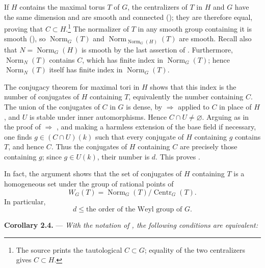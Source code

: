 If \(H\) contains the maximal torus \(T\) of \(G\), the centralizers
of \(T\) in \(H\) and \(G\) have the same dimension and are smooth
and connected (); they are therefore equal, proving that
\(C\subset H\).\footnote{The source prints the tautological
\(C\subset G\); equality of the two centralizers gives
\(C\subset H\).} The normalizer of \(T\) in any smooth group
containing it is smooth (), so
\(\operatorname{Norm}_G(T)\) and
\(\operatorname{Norm}_{\operatorname{Norm}_G(H)}(T)\) are smooth.
Recall also that \(N=\operatorname{Norm}_G(H)\) is smooth by the
last assertion of . Furthermore,
\(\operatorname{Norm}_N(T)\) contains \(C\), which has finite index
in \(\operatorname{Norm}_G(T)\); hence
\(\operatorname{Norm}_N(T)\) itself has finite index in
\(\operatorname{Norm}_G(T)\).

The conjugacy theorem for maximal tori in \(H\) shows that this index
is the number of conjugates of \(H\) containing \(T\), equivalently
the number containing \(C\). The union of the conjugates of \(C\) in
\(G\) is dense, by  \(\Rightarrow\)  applied to \(C\) in
place of \(H\), and \(U\) is stable under inner automorphisms. Hence
\(C\cap U\neq\varnothing\). Arguing as in the proof of
 \(\Rightarrow\) , and making a harmless extension of the
base field if necessary, one finds
\(g\in(C\cap U)(k)\) such that every conjugate of \(H\) containing
\(g\) contains \(T\), and hence \(C\). Thus the conjugates of \(H\)
containing \(C\) are precisely those containing \(g\); since
\(g\in U(k)\), their number is \(d\). This proves .

In fact, the argument shows that the set of conjugates of \(H\)
containing \(T\) is a homogeneous set under the group of rational
points of
\[
  W_G(T)=
  \operatorname{Norm}_G(T)/\operatorname{Centr}_G(T).
\]
In particular,
\[
  d\leq\text{the order of the Weyl group of \(G\)}.
\]

\medskip
\noindent{}\textbf{Corollary 2.4.} ---
\textit{With the notation of , the following conditions are
equivalent:}

